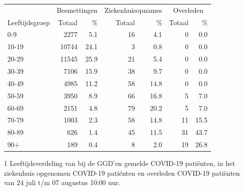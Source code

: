 \documentclass[
  english,
  man,floatsintext]{apa6}
\begin{document}
\begin{table}
\centering\begingroup\fontsize{11}{13}\selectfont

\begin{threeparttable}
\begin{tabular}{lrrrrrr}
\toprule
\multicolumn{1}{c}{ } & \multicolumn{2}{c}{Besmettingen} & \multicolumn{2}{c}{Ziekenhuisopnames} & \multicolumn{2}{c}{Overleden} \\
\cmidrule(l{3pt}r{3pt}){2-3} \cmidrule(l{3pt}r{3pt}){4-5} \cmidrule(l{3pt}r{3pt}){6-7}
Leeftijdsgroep & Totaal & \% & Totaal & \% & Totaal & \%\\
\midrule
0-9 & 2277 & 5.1 & 16 & 4.1 & 0 & 0.0\\
10-19 & 10744 & 24.1 & 3 & 0.8 & 0 & 0.0\\
20-29 & 11545 & 25.9 & 21 & 5.4 & 0 & 0.0\\
30-39 & 7106 & 15.9 & 38 & 9.7 & 0 & 0.0\\
40-49 & 4985 & 11.2 & 58 & 14.8 & 0 & 0.0\\
50-59 & 3950 & 8.9 & 66 & 16.8 & 5 & 7.0\\
60-69 & 2151 & 4.8 & 79 & 20.2 & 5 & 7.0\\
70-79 & 1003 & 2.3 & 58 & 14.8 & 11 & 15.5\\
80-89 & 626 & 1.4 & 45 & 11.5 & 31 & 43.7\\
90+ & 189 & 0.4 & 8 & 2.0 & 19 & 26.8\\
\bottomrule
\end{tabular}
\begin{tablenotes}
\item[1] Leeftijdsverdeling van bij de GGD’en gemelde COVID-19 patiënten, in het ziekenhuis opgenomen COVID-19 patiënten en overleden COVID-19 patiënten van 24 juli t/m 07 augustus 10:00 uur.
\end{tablenotes}
\end{threeparttable}
\endgroup{}
\end{table}

\newpage
\end{document}
